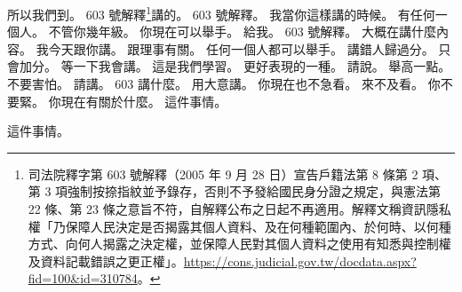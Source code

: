\hypertarget{c01:cue:752}{}所以我們到。
\hypertarget{c01:cue:753}{}603 號解釋\footnote{司法院釋字第 603 號解釋（2005 年 9 月 28 日）宣告戶籍法第 8 條第 2 項、第 3 項強制按捺指紋並予錄存，否則不予發給國民身分證之規定，與憲法第 22 條、第 23 條之意旨不符，自解釋公布之日起不再適用。解釋文稱資訊隱私權「乃保障人民決定是否揭露其個人資料、及在何種範圍內、於何時、以何種方式、向何人揭露之決定權，並保障人民對其個人資料之使用有知悉與控制權及資料記載錯誤之更正權」。\url{https://cons.judicial.gov.tw/docdata.aspx?fid=100&id=310784}。}講的。
\hypertarget{c01:cue:754}{}603 號解釋。
\hypertarget{c01:cue:755}{}我當你這樣講的時候。
\hypertarget{c01:cue:756}{}有任何一個人。
\hypertarget{c01:cue:757}{}不管你幾年級。
\hypertarget{c01:cue:758}{}你現在可以舉手。
\hypertarget{c01:cue:759}{}給我。
\hypertarget{c01:cue:760}{}603 號解釋。
\hypertarget{c01:cue:761}{}大概在講什麼內容。
\hypertarget{c01:cue:762}{}我今天跟你講。
\hypertarget{c01:cue:763}{}跟理事有關。
\hypertarget{c01:cue:764}{}任何一個人都可以舉手。
\hypertarget{c01:cue:765}{}講錯人歸過分。
\hypertarget{c01:cue:766}{}只會加分。
\hypertarget{c01:cue:767}{}等一下我會講。
\hypertarget{c01:cue:768}{}這是我們學習。
\hypertarget{c01:cue:769}{}更好表現的一種。
\hypertarget{c01:cue:770}{}請說。
\hypertarget{c01:cue:771}{}舉高一點。
\hypertarget{c01:cue:772}{}不要害怕。
\hypertarget{c01:cue:773}{}請講。
\hypertarget{c01:cue:774}{}603 講什麼。
\hypertarget{c01:cue:775}{}用大意講。
\hypertarget{c01:cue:776}{}你現在也不急看。
\hypertarget{c01:cue:777}{}來不及看。
\hypertarget{c01:cue:778}{}你不要緊。
\hypertarget{c01:cue:779}{}你現在有關於什麼。
\hypertarget{c01:cue:780}{}這件事情。

\hypertarget{c01:cue:781}{}這件事情。

